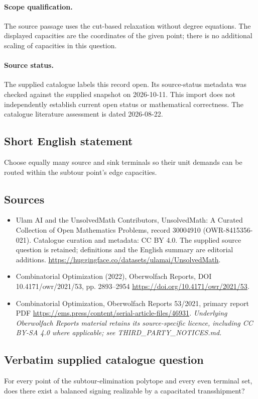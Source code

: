 \documentclass[11pt]{article}
\begin{document}
\paragraph{Scope qualification.}
The source passage uses the cut-based relaxation without degree equations. The displayed capacities are the coordinates of the given point; there is no additional scaling of capacities in this question.
\paragraph{Source status.}
The supplied catalogue labels this record open. Its source-status metadata was checked against the supplied snapshot on 2026-10-11. This import does not independently establish current open status or mathematical correctness. The catalogue literature assessment is dated 2026-08-22.
\subsection{Short English statement}
Choose equally many source and sink terminals so their unit demands can be routed within the subtour point's edge capacities.
\subsection{Sources}
\begin{itemize}
\item[S1] Ulam AI and the UnsolvedMath Contributors, UnsolvedMath: A Curated Collection of Open Mathematics Problems, record 30004910 (OWR-8415356-021). Catalogue curation and metadata: CC BY 4.0. The supplied source question is retained; definitions and the English summary are editorial additions.
\url{https://huggingface.co/datasets/ulamai/UnsolvedMath}.
\item[S2] Combinatorial Optimization (2022), Oberwolfach Reports, DOI 10.4171/owr/2021/53, pp. 2893--2954
\url{https://doi.org/10.4171/owr/2021/53}.
\item[S3] Combinatorial Optimization, Oberwolfach Reports 53/2021, primary report PDF
\url{https://ems.press/content/serial-article-files/46931}.
\textit{Underlying Oberwolfach Reports material retains its source-specific licence, including CC BY-SA 4.0 where applicable; see THIRD\_PARTY\_NOTICES.md.}
\end{itemize}
\subsection{Verbatim supplied catalogue question}
For every point of the subtour-elimination polytope and every even terminal set, does there exist a balanced signing realizable by a capacitated transshipment?
\end{document}
